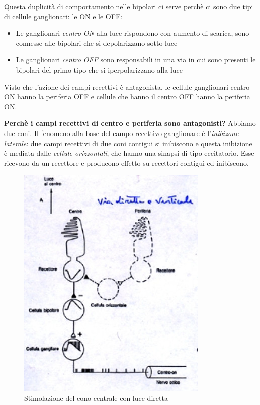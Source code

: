 \documentclass[a4paper,12pt]{article}
\begin{document}
Questa duplicità di comportamento nelle bipolari ci serve perchè ci sono due tipi di cellule ganglionari: le ON e le OFF:
\begin{itemize}
\item{Le ganglionari \emph{centro ON} alla luce rispondono con aumento di scarica, sono connesse alle bipolari che si depolarizzano sotto luce}
\item{Le ganglionari \emph{centro OFF} sono responsabili in una via in cui sono presenti le bipolari del primo tipo che si iperpolarizzano alla luce}
\end{itemize}

Visto che l'azione dei campi recettivi è antagonista, le cellule ganglionari centro ON hanno la periferia OFF e cellule che hanno il centro OFF hanno la periferia ON. 

\textbf{Perchè i campi recettivi di centro e periferia sono antagonisti?}
Abbiamo due coni. Il fenomeno alla base del campo recettivo ganglionare è l'\emph{inibizone laterale}: due campi recettivi di due coni contigui si inibiscono e questa inibizione è mediata dalle \emph{cellule orizzontali}, che hanno una sinapsi di tipo eccitatorio. Esse ricevono da un recettore e producono effetto su recettori contigui ed inibiscono. 

\begin{figure}[H]
\centering
\includegraphics[scale=0.4]{immagine/A.jpg}
\caption{Stimolazione del cono centrale con luce diretta}
\end{figure}
\end{document}
